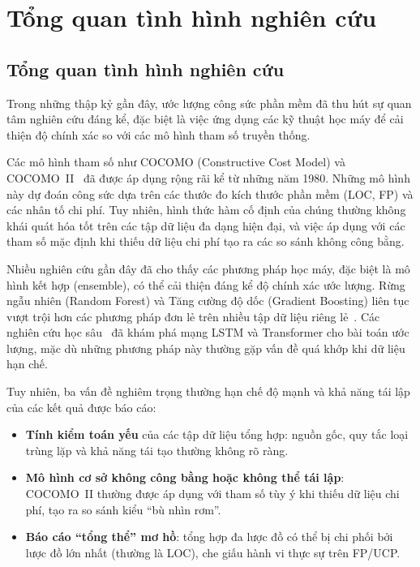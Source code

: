 \documentclass[12pt,a4paper]{article}
\begin{document}
\section{Tổng quan tình hình nghiên cứu}

\subsection{Tổng quan tình hình nghiên cứu}

Trong những thập kỷ gần đây, ước lượng công sức phần mềm đã thu hút sự quan tâm nghiên cứu đáng kể, đặc biệt là việc ứng dụng các kỹ thuật học máy để cải thiện độ chính xác so với các mô hình tham số truyền thống.

Các mô hình tham số như COCOMO (Constructive Cost Model) và COCOMO~II~\cite{boehm2000cocomo} đã được áp dụng rộng rãi kể từ những năm 1980. Những mô hình này dự đoán công sức dựa trên các thước đo kích thước phần mềm (LOC, FP) và các nhân tố chi phí. Tuy nhiên, hình thức hàm cố định của chúng thường không khái quát hóa tốt trên các tập dữ liệu đa dạng hiện đại, và việc áp dụng với các tham số mặc định khi thiếu dữ liệu chi phí tạo ra các so sánh không công bằng.

Nhiều nghiên cứu gần đây đã cho thấy các phương pháp học máy, đặc biệt là mô hình kết hợp (ensemble), có thể cải thiện đáng kể độ chính xác ước lượng. Rừng ngẫu nhiên (Random Forest) và Tăng cường độ dốc (Gradient Boosting) liên tục vượt trội hơn các phương pháp đơn lẻ trên nhiều tập dữ liệu riêng lẻ~\cite{tanveer2023survey}. Các nghiên cứu học sâu~\cite{azzeh2019cross} đã khám phá mạng LSTM và Transformer cho bài toán ước lượng, mặc dù những phương pháp này thường gặp vấn đề quá khớp khi dữ liệu hạn chế.

Tuy nhiên, ba vấn đề nghiêm trọng thường hạn chế độ mạnh và khả năng tái lập của các kết quả được báo cáo:

\begin{itemize}[leftmargin=2em]
    \item \textbf{Tính kiểm toán yếu} của các tập dữ liệu tổng hợp: nguồn gốc, quy tắc loại trùng lặp và khả năng tái tạo thường không rõ ràng.
    \item \textbf{Mô hình cơ sở không công bằng hoặc không thể tái lập}: COCOMO~II thường được áp dụng với tham số tùy ý khi thiếu dữ liệu chi phí, tạo ra so sánh kiểu ``bù nhìn rơm''.
    \item \textbf{Báo cáo ``tổng thể'' mơ hồ}: tổng hợp đa lược đồ có thể bị chi phối bởi lược đồ lớn nhất (thường là LOC), che giấu hành vi thực sự trên FP/UCP.
\end{itemize}
\end{document}
